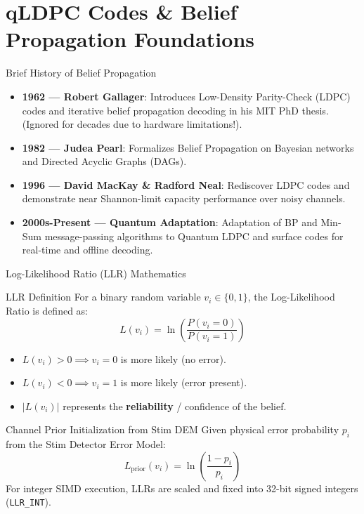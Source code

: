 \section{qLDPC Codes \& Belief Propagation Foundations}

\begin{frame}{Brief History of Belief Propagation}
    \begin{itemize}
        \item \textbf{1962 — Robert Gallager}: Introduces Low-Density Parity-Check (LDPC) codes and iterative belief propagation decoding in his MIT PhD thesis. (Ignored for decades due to hardware limitations!).
        \item \textbf{1982 — Judea Pearl}: Formalizes Belief Propagation on Bayesian networks and Directed Acyclic Graphs (DAGs).
        \item \textbf{1996 — David MacKay \& Radford Neal}: Rediscover LDPC codes and demonstrate near Shannon-limit capacity performance over noisy channels.
        \item \textbf{2000s-Present — Quantum Adaptation}: Adaptation of BP and Min-Sum message-passing algorithms to Quantum LDPC and surface codes for real-time and offline decoding.
    \end{itemize}
\end{frame}

\begin{frame}{Log-Likelihood Ratio (LLR) Mathematics}
    \begin{block}{LLR Definition}
        For a binary random variable $v_i \in \{0, 1\}$, the Log-Likelihood Ratio is defined as:
        $$L(v_i) = \ln \left( \frac{P(v_i = 0)}{P(v_i = 1)} \right)$$
        \begin{itemize}
            \item $L(v_i) > 0 \implies v_i = 0$ is more likely (no error).
            \item $L(v_i) < 0 \implies v_i = 1$ is more likely (error present).
            \item $|L(v_i)|$ represents the \textbf{reliability} / confidence of the belief.
        \end{itemize}
    \end{block}
    
    \begin{block}{Channel Prior Initialization from Stim DEM}
        Given physical error probability $p_i$ from the Stim Detector Error Model:
        $$L_{\text{prior}}(v_i) = \ln \left( \frac{1 - p_i}{p_i} \right)$$
        For integer SIMD execution, LLRs are scaled and fixed into 32-bit signed integers (\texttt{LLR\_INT}).
    \end{block}
\end{frame}

